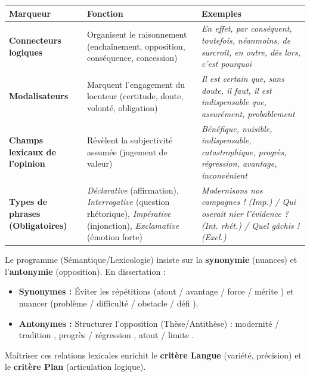 \documentclass[11pt]{article}
\begin{document}
\begin{center}
\begin{tabularx}{\linewidth}{|l|X|X|}\hline
\rowcolor{popblueL}
\textbf{Marqueur} & \textbf{Fonction} & \textbf{Exemples} \\ \hline
\textbf{Connecteurs logiques} & Organisent le raisonnement (enchaînement, opposition, conséquence, concession) & \emph{En effet, par conséquent, toutefois, néanmoins, de surcroît, en outre, dès lors, c'est pourquoi} \\ \hline
\textbf{Modalisateurs} & Marquent l'engagement du locuteur (certitude, doute, volonté, obligation) & \emph{Il est certain que, sans doute, il faut, il est indispensable que, assurément, probablement} \\ \hline
\textbf{Champs lexicaux de l'opinion} & Révèlent la subjectivité assumée (jugement de valeur) & \emph{Bénéfique, nuisible, indispensable, catastrophique, progrès, régression, avantage, inconvénient} \\ \hline
\textbf{Types de phrases (Obligatoires)} & \emph{Déclarative} (affirmation), \emph{Interrogative} (question rhétorique), \emph{Impérative} (injonction), \emph{Exclamative} (émotion forte) & \emph{Modernisons nos campagnes ! (Imp.) / Qui oserait nier l'évidence ? (Int. rhét.) / Quel gâchis ! (Excl.)} \\ \hline
\end{tabularx}
\end{center}

\begin{savaistu}
Le programme (Sémantique/Lexicologie) insiste sur la \textbf{synonymie} (nuances) et l'\textbf{antonymie} (opposition). En dissertation :
\begin{itemize}
    \item \textbf{Synonymes :} Éviter les répétitions (\og atout / avantage / force / mérite \fg{}) et nuancer (\og problème / difficulté / obstacle / défi \fg{}).
    \item \textbf{Antonymes :} Structurer l'opposition (Thèse/Antithèse) : \og modernité / tradition \fg{}, \og progrès / régression \fg{}, \og atout / limite \fg{}.
\end{itemize}
Maîtriser ces relations lexicales enrichit le \textbf{critère Langue} (variété, précision) et le \textbf{critère Plan} (articulation logique).
\end{savaistu}
\end{document}
